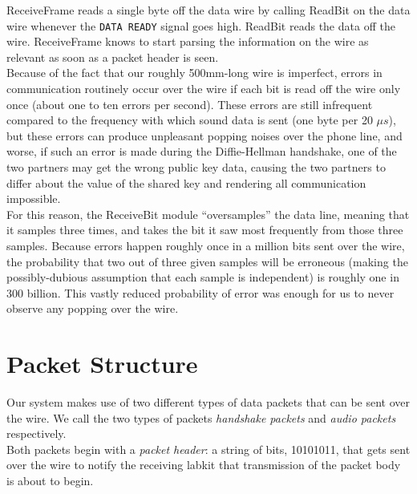 \documentclass[a4paper]{report}
\begin{document}
ReceiveFrame reads a single byte off the data wire by calling ReadBit on the data wire whenever the \verb|DATA READY| signal goes high. ReadBit reads the data off the wire. ReceiveFrame knows to start parsing the information on the wire as relevant as soon as a packet header is seen. \\

Because of the fact that our roughly 500mm-long wire is imperfect, errors in communication routinely occur over the wire if each bit is read off the wire only once (about one to ten errors per second). These errors are still infrequent compared to the frequency with which sound data is sent (one byte per 20 $\mu s$), but these errors can produce unpleasant popping noises over the phone line, and worse, if such an error is made during the Diffie-Hellman handshake, one of the two partners may get the wrong public key data, causing the two partners to differ about the value of the shared key and rendering all communication impossible. \\

For this reason, the ReceiveBit module ``oversamples'' the data line, meaning that it samples three times, and takes the bit it saw most frequently from those three samples. Because errors happen roughly once in a million bits sent over the wire, the probability that two out of three given samples will be erroneous (making the possibly-dubious assumption that each sample is independent) is roughly one in 300 billion. This vastly reduced probability of error was enough for us to never observe any popping over the wire.

\section{Packet Structure}

Our system makes use of two different types of data packets that can be sent over the wire. We call the two types of packets \emph{handshake packets} and \emph{audio packets} respectively.  \\


Both packets begin with a \emph{packet header}: a string of bits, 10101011, that gets sent over the wire to notify the receiving labkit that transmission of the packet body is about to begin.  \\
\end{document}
